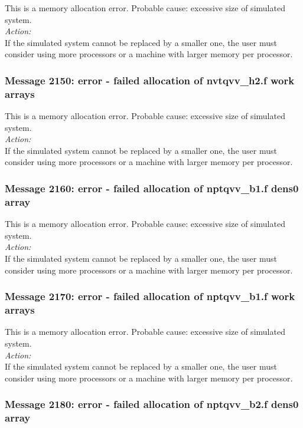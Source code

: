 This is a memory allocation error. Probable cause: excessive size of
simulated system. \\

\noindent
{\em Action:}\\
If the simulated system cannot be replaced by a smaller one, the user
must consider using more processors or a machine with larger memory
per processor.

\subsubsection*{Message 2150: error - failed allocation of nvtqvv\_h2.f
work arrays}

This is a memory allocation error. Probable cause: excessive size of
simulated system. \\

\noindent
{\em Action:}\\
If the simulated system cannot be replaced by a smaller one, the user
must consider using more processors or a machine with larger memory
per processor.

\subsubsection*{Message 2160: error - failed allocation of nptqvv\_b1.f
dens0 array}

This is a memory allocation error. Probable cause: excessive size of
simulated system. \\

\noindent
{\em Action:}\\
If the simulated system cannot be replaced by a smaller one, the user
must consider using more processors or a machine with larger memory
per processor.

\subsubsection*{Message 2170: error - failed allocation of nptqvv\_b1.f
work arrays}

This is a memory allocation error. Probable cause: excessive size of
simulated system. \\

\noindent
{\em Action:}\\
If the simulated system cannot be replaced by a smaller one, the user
must consider using more processors or a machine with larger memory
per processor.

\subsubsection*{Message 2180: error - failed allocation of nptqvv\_b2.f
dens0 array}

